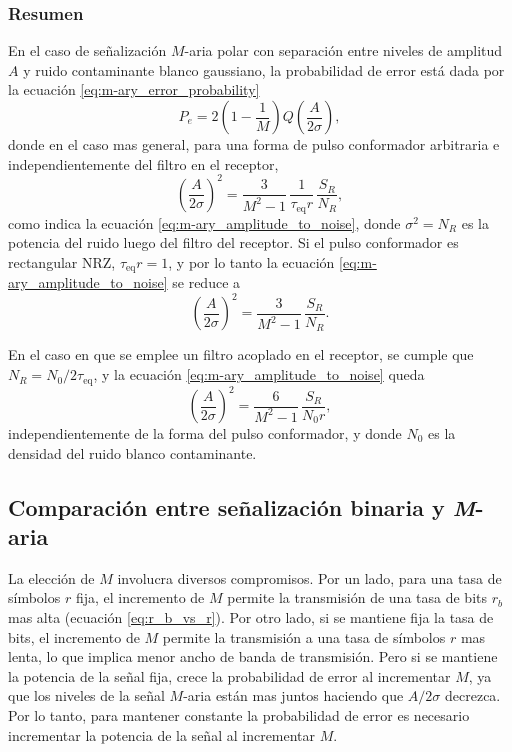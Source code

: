 \documentclass[a4paper]{article}
\begin{document}
\subsubsection*{Resumen}

En el caso de señalización \(M\)-aria polar con separación entre niveles de amplitud \(A\) y ruido contaminante blanco gaussiano, la probabilidad de error está dada por la ecuación \ref{eq:m-ary_error_probability}
\[
  P_e=2\left(1-\frac{1}{M}\right)Q\left(\frac{A}{2\sigma}\right),
\]
donde en el caso mas general, para una forma de pulso conformador arbitraria e independientemente del filtro en el receptor,
\[
 \left(\frac{A}{2\sigma}\right)^2=\frac{3}{M^2-1}\,\frac{1}{\tau_\textrm{eq}r}\,\frac{S_R}{N_R},
\]
como indica la ecuación \ref{eq:m-ary_amplitude_to_noise}, donde \(\sigma^2=N_R\) es la potencia del ruido luego del filtro del receptor. Si el pulso conformador es rectangular NRZ, \(\tau_\textrm{eq}r=1\), y por lo tanto la ecuación \ref{eq:m-ary_amplitude_to_noise} se reduce a
\[
 \left(\frac{A}{2\sigma}\right)^2=\frac{3}{M^2-1}\,\frac{S_R}{N_R}.
\]

En el caso en que se emplee un filtro acoplado en el receptor, se cumple que \(N_{R}=N_0/2\tau_\textrm{eq}\), y la ecuación \ref{eq:m-ary_amplitude_to_noise} queda
\[
 \left(\frac{A}{2\sigma}\right)^2=\frac{6}{M^2-1}\,\frac{S_R}{N_0r},
\]
independientemente de la forma del pulso conformador, y donde \(N_0\) es la densidad del ruido blanco contaminante.


\subsection{Comparación entre señalización binaria y \emph{M}-aria}

La elección de \(M\) involucra diversos compromisos. Por un lado, para una tasa de símbolos \(r\) fija, el incremento de \(M\) permite la transmisión de una tasa de bits \(r_b\) mas alta (ecuación \ref{eq:r_b_vs_r}). Por otro lado, si se mantiene fija la tasa de bits, el incremento de \(M\) permite la transmisión a una tasa de símbolos \(r\) mas lenta, lo que implica menor ancho de banda de transmisión. Pero si se mantiene la potencia de la señal fija, crece la probabilidad de error al incrementar \(M\), ya que los niveles de la señal \(M\)-aria están mas juntos haciendo que \(A/2\sigma\) decrezca. Por lo tanto, para mantener constante la probabilidad de error es necesario incrementar la potencia de la señal al incrementar \(M\).
\end{document}

